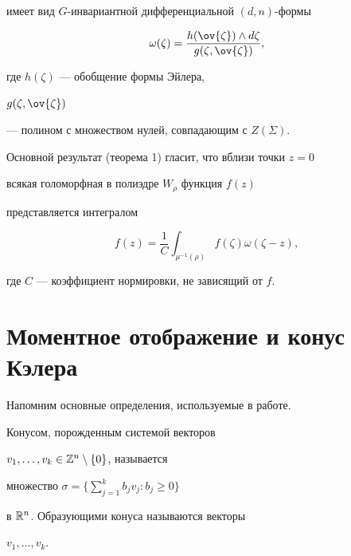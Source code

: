 имеет вид $G$-инвариантной дифференциальной $(d,n)$-формы


\begin{equation}


\omega(\zeta)=\frac{h(\ov{\zeta})\wedge


d\zeta}{g(\zeta,\ov{\zeta})}, \label{form}


\end{equation}


где $h(\zeta)$ --- обобщение формы Эйлера,  


$g(\zeta,\ov{\zeta})$


--- полином с множеством нулей, совпадающим с $Z(\Sigma)$.





Основной результат (теорема 1) гласит, что вблизи точки $z=0$


всякая голоморфная в полиэдре $W_{\rho}$ функция $f(z)$


представляется интегралом


\begin{equation}


f(z)=\frac1C\int_{\mu^{-1}(\rho)}f(\zeta)\omega(\zeta-z),


\label{int}


\end{equation}


где $C$ --- коэффициент нормировки, не зависящий от $f$.








\section{Моментное отображение и конус Кэлера}





Напомним основные определения, используемые в работе.





Конусом, порожденным системой векторов


$v_1,\dotsc,v_k\in\Bbb{Z}^n\setminus\{0\}$, называется


множество $\sigma=\Big\{\sum\limits_{j=1}^{k}b_jv_j: b_j\geqslant0\Big\}$


в $\Bbb{R}^n$. Образующими конуса называются векторы


$v_1,\dotsc,v_k$.


